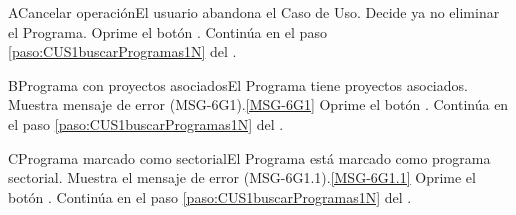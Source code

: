 		\begin{UCtrayectoriaA}{A}{Cancelar operaci\'on}{El usuario abandona el Caso de Uso.}
			\UCpaso[\UCactor] Decide ya no eliminar el Programa. \label{Datos_Asoc_Equipo}
			\UCpaso[\UCactor] Oprime el bot\'on .
			\UCpaso Contin\'ua en el paso \ref{paso:CUS1buscarProgramas1N} del .
		\end{UCtrayectoriaA}

                \begin{UCtrayectoriaA}{B}{Programa con proyectos asociados}{El Programa tiene proyectos asociados.}
			\UCpaso Muestra mensaje de error (MSG-6G1).\ref{MSG-6G1} \label{Datos_Asoc_Equipo}
			\UCpaso[\UCactor] Oprime el bot\'on .
			\UCpaso Contin\'ua en el paso \ref{paso:CUS1buscarProgramas1N} del .
		\end{UCtrayectoriaA}
		
		\begin{UCtrayectoriaA}{C}{Programa marcado como sectorial}{El Programa est\'a marcado como programa sectorial.}
			\UCpaso Muestra el mensaje de error (MSG-6G1.1).\ref{MSG-6G1.1}
			\UCpaso[\UCactor] Oprime el bot\'on .
			\UCpaso Contin\'ua en el paso \ref{paso:CUS1buscarProgramas1N} del .
		\end{UCtrayectoriaA}
